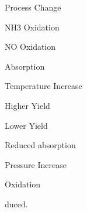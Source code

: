 \documentclass[a4paper,portrait,12pt]{article}
\begin{document}
\begin{flushleft}
Process Change
\end{flushleft}





\begin{flushleft}
NH3 Oxidation
\end{flushleft}





\begin{flushleft}
NO Oxidation
\end{flushleft}





\begin{flushleft}
Absorption
\end{flushleft}





\begin{flushleft}
Temperature Increase
\end{flushleft}





\begin{flushleft}
Higher Yield
\end{flushleft}





\begin{flushleft}
Lower Yield
\end{flushleft}





\begin{flushleft}
Reduced absorption
\end{flushleft}





\begin{flushleft}
Pressure Increase
\end{flushleft}





\begin{flushleft}
Oxidation
\end{flushleft}


\begin{flushleft}
duced.
\end{flushleft}
\end{document}
